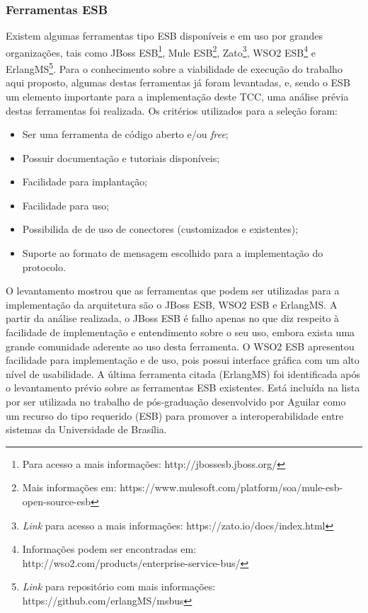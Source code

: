 \subsubsection{Ferramentas ESB}
Existem algumas ferramentas tipo ESB disponíveis e em uso por grandes organizações, tais como JBoss ESB\footnote{Para acesso a mais informações: http://jbossesb.jboss.org/}, Mule ESB\footnote{Mais informações em: https://www.mulesoft.com/platform/soa/mule-esb-open-source-esb}, Zato\footnote{\textit{Link} para acesso a mais informações: https://zato.io/docs/index.html}, WSO2 ESB\footnote{Informações podem ser encontradas em: http://wso2.com/products/enterprise-service-bus/} e ErlangMS\footnote{\textit{Link} para repositório com mais informações: https://github.com/erlangMS/msbus}. Para o conhecimento sobre a viabilidade de execução do trabalho aqui proposto, algumas destas ferramentas já foram levantadas, e, sendo o ESB um elemento importante para a implementação deste TCC, uma análise prévia destas ferramentas foi realizada. Os critérios utilizados para a seleção foram:

\begin{itemize}
\item Ser uma ferramenta de código aberto e/ou \textit{free};
\item Possuir documentação e tutoriais disponíveis;
\item Facilidade para implantação;
\item Facilidade para uso;
\item Possibilida de de uso de conectores (customizados e existentes);
\item Suporte ao formato de mensagem escolhido para a implementação do protocolo.
\end{itemize}

O levantamento mostrou que as ferramentas que podem ser utilizadas para a implementação da arquitetura são o JBoss ESB, WSO2 ESB e ErlangMS. A partir da análise realizada, o JBoss ESB é falho apenas no que diz respeito à facilidade de implementação e entendimento sobre o seu uso, embora exista uma grande comunidade aderente ao uso desta ferramenta. O WSO2 ESB apresentou facilidade para implementação e de uso, pois possui interface gráfica com um alto nível de usabilidade. A última ferramenta citada (ErlangMS) foi identificada após o levantamento prévio sobre as ferramentas ESB existentes. Está incluída na lista por ser utilizada no trabalho de pós-graduação desenvolvido por Aguilar \cite{agilar_uma_2015} como um recurso do tipo requerido (ESB) para promover a interoperabilidade entre sistemas da Universidade de Brasília.

